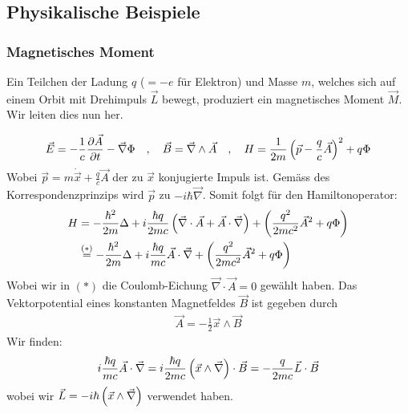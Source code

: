 \subsection{Physikalische Beispiele}

\subsubsection{Magnetisches Moment}

Ein Teilchen der Ladung $q$ ($=-e$ für Elektron) und Masse $m$, welches sich auf
einem Orbit mit Drehimpuls $\vec{L}$ bewegt, produziert ein magnetisches Moment
$\vec{M}$. Wir leiten dies nun her.

\begin{align*}
    \vec{E} = - \frac{1}{c} \frac{\partial \vec{A}}{\partial t} - \vec{\nabla} \Phi
    \hspace{10pt} , \hspace{10pt}
    \vec{B} = \vec{\nabla} \wedge \vec{A}
    \hspace{10pt} , \hspace{10pt}
    H = \frac{1}{2m} \left( \vec{p} - \frac{q}{c} \vec{A} \right)^2 + q \Phi
\end{align*}
Wobei $\vec{p} = m \dot{\vec{x}} + \frac{q}{c} \vec{A}$ der zu $\vec{x}$
konjugierte Impuls ist. Gemäss des Korrespondenzprinzips wird $\vec{p}$ zu
$-i \hbar \vec{\nabla}$. Somit folgt für den Hamiltonoperator:
\begin{align*}
    H &= - \frac{\hbar^2}{2m} \Delta + i \frac{\hbar q}{2 m c}
    \left( \vec{\nabla} \cdot \vec{A} + \vec{A} \cdot \vec{\nabla} \right)
    + \left( \frac{q^2}{2mc^2} \vec{A}^2 + q \Phi \right)
    \\
    &\stackrel{(\ast)}{=} - \frac{\hbar^2}{2m} \Delta + i \frac{\hbar q}{m c}
    \vec{A} \cdot \vec{\nabla} + \left( \frac{q^2}{2mc^2} \vec{A}^2 + q \Phi \right)
\end{align*}
Wobei wir in $(\ast)$ die Coulomb-Eichung $\vec{\nabla} \cdot \vec{A} = 0$ gewählt
haben. Das Vektorpotential eines konstanten Magnetfeldes $\vec{B}$ ist gegeben
durch
\begin{align*}
    \vec{A} = - \frac{1}{2} \vec{x} \wedge \vec{B}
\end{align*}
Wir finden:
\begin{align*}
    i \frac{\hbar q}{m c} \vec{A} \cdot \vec{\nabla}
    = i \frac{\hbar q}{2 m c} \left( \vec{x} \wedge \vec{\nabla} \right) \cdot \vec{B}
    = - \frac{q}{2mc} \vec{L} \cdot \vec{B}
\end{align*}
wobei wir $\vec{L} = -i \hbar \left( \vec{x} \wedge \vec{\nabla} \right)$ verwendet haben.
